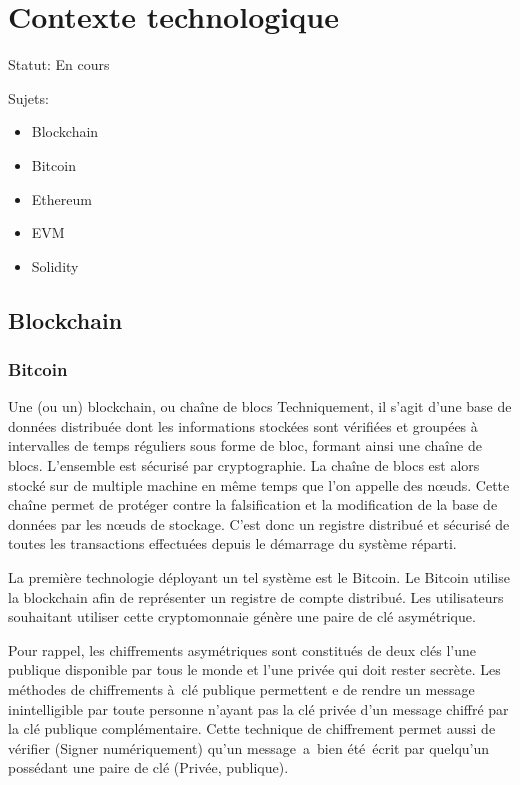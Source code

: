 \section{Contexte technologique}

Statut: En cours

Sujets:
\begin{itemize}
    \item Blockchain
    \item Bitcoin
    \item Ethereum
    \item EVM
    \item Solidity
\end{itemize}


\subsection{Blockchain}

\subsubsection{Bitcoin}

Une (ou un) blockchain, ou chaîne de blocs  Techniquement, il s'agit d'une base de données distribuée dont les informations stockées sont vérifiées 
et groupées à intervalles de temps réguliers sous forme de bloc, formant ainsi une chaîne de blocs. L'ensemble est sécurisé par cryptographie. 
La chaîne de blocs est alors stocké sur de multiple machine en même temps que l'on appelle des nœuds. 
Cette chaîne permet de protéger contre la falsification et la modification de la base de données par les nœuds de stockage.
C'est donc un registre distribué et sécurisé de toutes les transactions effectuées depuis le démarrage du système réparti.

La première technologie déployant un tel système est le Bitcoin. Le Bitcoin utilise la blockchain afin de représenter un registre de compte
distribué. Les utilisateurs souhaitant utiliser cette cryptomonnaie génère une paire de clé asymétrique.

Pour rappel, les chiffrements asymétriques sont constitués de deux clés l'une publique disponible par tous le monde et l'une privée qui doit
rester secrète. Les méthodes de chiffrements à clé publique permettent e de rendre un message inintelligible par toute personne n'ayant pas la clé 
privée d'un message chiffré par la clé publique complémentaire. Cette technique de chiffrement permet aussi de vérifier (Signer numériquement) qu'un
message a bien été écrit par quelqu'un possédant une paire de clé (Privée, publique).

